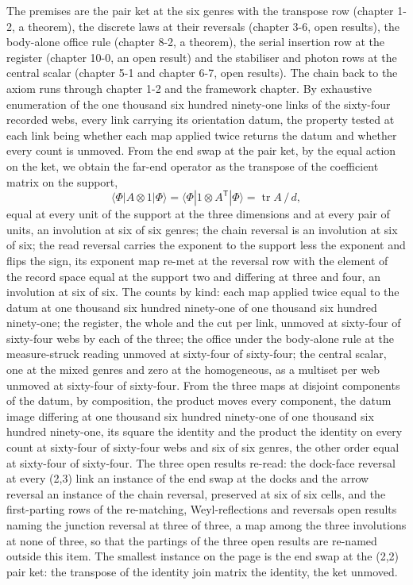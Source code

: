 \begin{chproof}[census]
The premises are the pair ket at the six genres with the transpose row (chapter 1-2, a theorem), the discrete laws at their reversals (chapter 3-6, open results), the body-alone office rule (chapter 8-2, a theorem), the serial insertion row at the register (chapter 10-0, an open result) and the stabiliser and photon rows at the central scalar (chapter 5-1 and chapter 6-7, open results). The chain back to the axiom runs through chapter 1-2 and the framework chapter. By exhaustive enumeration of the one thousand six hundred ninety-one links of the sixty-four recorded webs, every link carrying its orientation datum, the property tested at each link being whether each map applied twice returns the datum and whether every count is unmoved. From the end swap at the pair ket, by the equal action on the ket, we obtain the far-end operator as the transpose of the coefficient matrix on the support,
\begin{equation}
\langle \Phi | A \otimes 1 | \Phi \rangle = \langle \Phi | 1 \otimes A^{\mathsf{T}} | \Phi \rangle = \operatorname{tr} A \, / \, d ,
\end{equation}
equal at every unit of the support at the three dimensions and at every pair of units, an involution at six of six genres; the chain reversal is an involution at six of six; the read reversal carries the exponent to the support less the exponent and flips the sign, its exponent map re-met at the reversal row with the element of the record space equal at the support two and differing at three and four, an involution at six of six. The counts by kind: each map applied twice equal to the datum at one thousand six hundred ninety-one of one thousand six hundred ninety-one; the register, the whole and the cut per link, unmoved at sixty-four of sixty-four webs by each of the three; the office under the body-alone rule at the measure-struck reading unmoved at sixty-four of sixty-four; the central scalar, one at the mixed genres and zero at the homogeneous, as a multiset per web unmoved at sixty-four of sixty-four. From the three maps at disjoint components of the datum, by composition, the product moves every component, the datum image differing at one thousand six hundred ninety-one of one thousand six hundred ninety-one, its square the identity and the product the identity on every count at sixty-four of sixty-four webs and six of six genres, the other order equal at sixty-four of sixty-four. The three open results re-read: the dock-face reversal at every (2,3) link an instance of the end swap at the docks and the arrow reversal an instance of the chain reversal, preserved at six of six cells, and the first-parting rows of the re-matching, Weyl-reflections and reversals open results naming the junction reversal at three of three, a map among the three involutions at none of three, so that the partings of the three open results are re-named outside this item. The smallest instance on the page is the end swap at the (2,2) pair ket: the transpose of the identity join matrix the identity, the ket unmoved.


\end{chproof}
